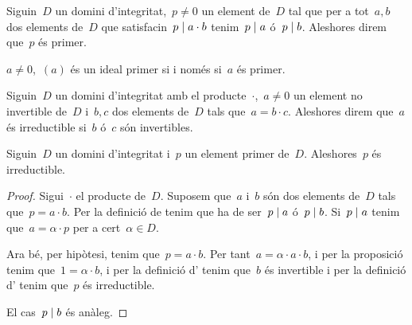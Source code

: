 \documentclass[../../main.tex]{subfiles}
\begin{document}
    \begin{definition}[Primer]
        \label{def:primer en un anell}
        Siguin~\(D\) un domini d'integritat,~\(p\neq0\) un element de~\(D\) tal que per a tot~\(a,b\) dos elements de~\(D\) que satisfacin~\(p\mathrel{|} a\cdot b\) tenim~\(p\mathrel{|} a\) ó~\(p\mathrel{|} b\).
        Aleshores direm que~\(p\) és primer.
    \end{definition}
    \begin{observation}
        \label{obs:ideals primer iff primer}
        \(a\neq0\),~\((a)\) és un ideal primer si i només si~\(a\) és primer.
    \end{observation}
    \begin{definition}
        \label{def:irreductible en un anell}
        Siguin~\(D\) un domini d'integritat amb el producte~\(\cdot\),~\(a\neq0\) un element no invertible de~\(D\) i~\(b,c\) dos elements de~\(D\) tals que~\(a=b\cdot c\).
        Aleshores direm que~\(a\) és irreductible si~\(b\) ó~\(c\) són invertibles.
    \end{definition}
    \begin{proposition}
        \label{prop:en un DI un primer és un irreductible}
        Siguin~\(D\) un domini d'integritat i~\(p\) un element primer de~\(D\).
        Aleshores~\(p\) és irreductible.
        \begin{proof}
            Sigui~\(\cdot\) el producte de~\(D\).
            Suposem que~\(a\) i~\(b\) són dos elements de~\(D\) tals que~\(p=a\cdot b\).
            Per la definició de  tenim que ha de ser~\(p\mathrel{|} a\) ó~\(p\mathrel{|} b\).
            Si~\(p\mathrel{|} a\) tenim que~\(a=\alpha\cdot p\) per a cert~\(\alpha\in D\).

            Ara bé, per hipòtesi, tenim que~\(p=a\cdot b\).
            Per tant~\(a=\alpha\cdot a\cdot b\), i per la proposició  tenim que~\(1=\alpha\cdot b\), i per la definició d' tenim que~\(b\) és invertible i per la definició d' tenim que~\(p\) és irreductible.

            El cas~\(p\mathrel{|} b\) és anàleg.
        \end{proof}
    \end{proposition}
\end{document}
